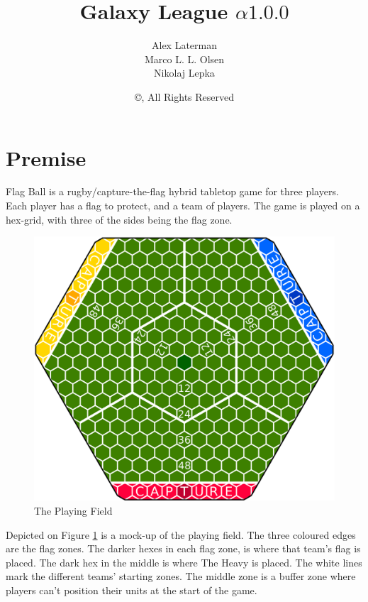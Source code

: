 \documentclass{book}
\title{Galaxy League $\alpha1.0.0$}
\author{Alex Laterman\\ Marco L. L. Olsen\\ Nikolaj Lepka}
\date{\copyright \the\year{}, All Rights Reserved}
\begin{document}
\maketitle

\section*{Premise}
Flag Ball is a rugby/capture-the-flag hybrid tabletop game for three players.
Each player has a flag to protect, and a team of players.
The game is played on a hex-grid, with three of the sides being the flag zone.
\begin{figure}
    \centering
    \includegraphics[width=\textwidth]{graphics/board-2}
    \caption{The Playing Field}
    \label{fig:court}
\end{figure}
Depicted on Figure \ref{fig:court} is a mock-up of the playing field. 
The three coloured edges are the flag zones.
The darker hexes in each flag zone, is where that team's flag is placed. 
The dark hex in the middle is where The Heavy is placed.
The white lines mark the different teams' starting zones.
The middle zone is a buffer zone where players can’t position their units at the start of the game.

\tableofcontents




\end{document}
